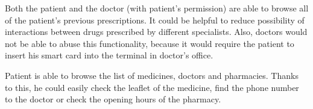 Both the patient and the doctor (with patient's permission) are able to browse all of the patient's previous prescriptions. 
It could be helpful to reduce possibility of interactions between drugs prescribed by different specialists. 
Also, doctors would not be able to abuse this functionality, because it would require the patient to insert his smart card into the terminal in doctor's office.

Patient is able to browse the list of medicines, doctors and pharmacies. 
Thanks to this, he could easily check the leaflet of the medicine, find the phone number to the doctor or check the opening hours of the pharmacy.



